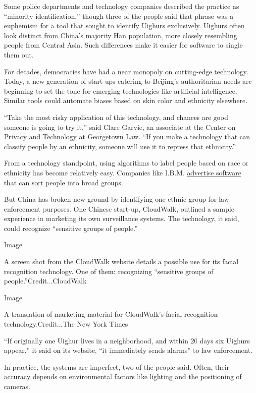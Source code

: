 Some police departments and technology companies described the practice
as ``minority identification,'' though three of the people said that
phrase was a euphemism for a tool that sought to identify Uighurs
exclusively. Uighurs often look distinct from China's majority Han
population, more closely resembling people from Central Asia. Such
differences make it easier for software to single them out.

For decades, democracies have had a near monopoly on cutting-edge
technology. Today, a new generation of start-ups catering to Beijing's
authoritarian needs are beginning to set the tone for emerging
technologies like artificial intelligence. Similar tools could automate
biases based on skin color and ethnicity elsewhere.

``Take the most risky application of this technology, and chances are
good someone is going to try it,'' said Clare Garvie, an associate at
the Center on Privacy and Technology at Georgetown Law. ``If you make a
technology that can classify people by an ethnicity, someone will use it
to repress that ethnicity.''

From a technology standpoint, using algorithms to label people based on
race or ethnicity has become relatively easy. Companies like I.B.M.
\href{https://www.ibm.com/support/knowledgecenter/SS88XH_2.0.0/iva/attribute_detectors_ranked_search.html}{advertise
software} that can sort people into broad groups.

But China has broken new ground by identifying one ethnic group for law
enforcement purposes. One Chinese start-up, CloudWalk, outlined a sample
experience in marketing its own surveillance systems. The technology, it
said, could recognize ``sensitive groups of people.''

Image

A screen shot from the CloudWalk website details a possible use for its
facial recognition technology. One of them: recognizing ``sensitive
groups of people.''Credit...CloudWalk

Image

A translation of marketing material for CloudWalk's facial recognition
technology.Credit...The New York Times

``If originally one Uighur lives in a neighborhood, and within 20 days
six Uighurs appear,'' it said on its website, ``it immediately sends
alarms'' to law enforcement.

In practice, the systems are imperfect, two of the people said. Often,
their accuracy depends on environmental factors like lighting and the
positioning of cameras.

